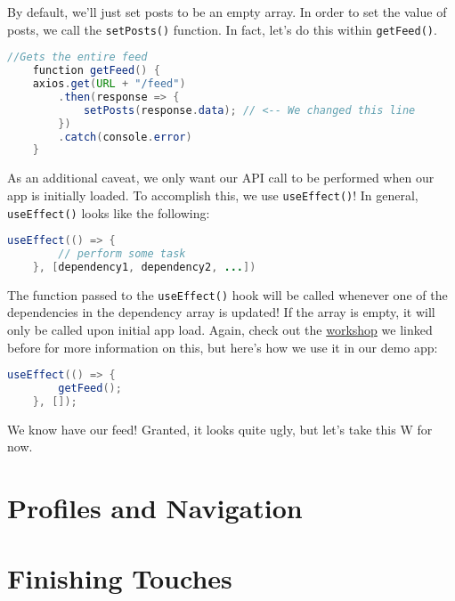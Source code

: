 By default, we'll just set posts to be an empty array. In order to set the value of posts, we call the \texttt{setPosts()} function. In fact, let's do this within  \texttt{getFeed()}.

\begin{lstlisting}[language=Java]
    //Gets the entire feed
    function getFeed() {
    axios.get(URL + "/feed")
        .then(response => { 
            setPosts(response.data); // <-- We changed this line
        })
        .catch(console.error)
    }
\end{lstlisting}

As an additional caveat, we only want our API call to be performed when our app is initially loaded. To accomplish this, we use \texttt{useEffect()}! In general, \texttt{useEffect()} looks like the following:

\begin{lstlisting}[language=Java]
    useEffect(() => {
        // perform some task
    }, [dependency1, dependency2, ...])
\end{lstlisting}

The function passed to the \texttt{useEffect()} hook will be called whenever one of the dependencies in the dependency array is updated! If the array is empty, it will only be called upon initial app load. Again, check out the \href{https://www.youtube.com/watch?v=ehgl3HpR5xQ}{workshop} we linked before for more information on this, but here's how we use it in our demo app:

\begin{lstlisting}[language=Java]
    useEffect(() => {
        getFeed();
    }, []);
\end{lstlisting}

We know have our feed! Granted, it looks quite ugly, but let's take this W for now. 

\section{Profiles and Navigation}

\section{Finishing Touches}
